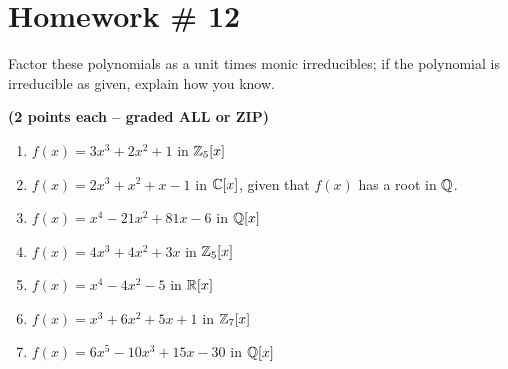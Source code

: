 \section{Homework \# 12}
\label{sec:HW12}
Factor these polynomials as a unit times monic irreducibles; if the polynomial is irreducible as given, explain how you know.  \\ \steezybreak

    \textbf{(2 points each – graded ALL or ZIP)} \\ \steezybreak
    
    \begin{enumerate}
        \setlength{\itemsep}{15pt} %
        \item $f(x) = 3x^3 + 2x^2 + 1$ in ${\mathbb{ Z}}_5[x]$
        \item $f(x) = 2x^3 + x^2 + x - 1$ in ${\mathbb{ C}}[x]$, given that $f(x)$ has a root in ${\mathbb{ Q}}$.
        \item $f(x) = x^4 - 21x^2 + 81x - 6$ in ${\mathbb{ Q}}[x]$
        \item $f(x) = 4x^3 + 4x^2 + 3x$ in ${\mathbb{ Z}}_5[x]$
        \item $f(x) = x^4 - 4x^2 - 5$ in ${\mathbb{ R}}[x]$
        \item $f(x) = x^3 + 6x^2 + 5x + 1$ in ${\mathbb{ Z}}_7[x]$
        \item $f(x) = 6x^5 - 10x^3 + 15x - 30$ in ${\mathbb{ Q}}[x]$
    \end{enumerate}

